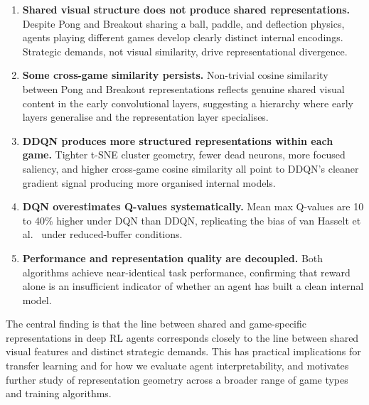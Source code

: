 \documentclass[a4paper]{article}
\begin{document}
\begin{enumerate}
    \item \textbf{Shared visual structure does not produce shared representations.} Despite Pong and Breakout sharing a ball, paddle, and deflection physics, agents playing different games develop clearly distinct internal encodings. Strategic demands, not visual similarity, drive representational divergence.
    \item \textbf{Some cross-game similarity persists.} Non-trivial cosine similarity between Pong and Breakout representations reflects genuine shared visual content in the early convolutional layers, suggesting a hierarchy where early layers generalise and the representation layer specialises.
    \item \textbf{DDQN produces more structured representations within each game.} Tighter t-SNE cluster geometry, fewer dead neurons, more focused saliency, and higher cross-game cosine similarity all point to DDQN's cleaner gradient signal producing more organised internal models.
    \item \textbf{DQN overestimates Q-values systematically.} Mean max Q-values are 10 to 40\% higher under DQN than DDQN, replicating the bias of van Hasselt et al.\ \cite{van2016deep} under reduced-buffer conditions.
    \item \textbf{Performance and representation quality are decoupled.} Both algorithms achieve near-identical task performance, confirming that reward alone is an insufficient indicator of whether an agent has built a clean internal model.
\end{enumerate}

The central finding is that the line between shared and game-specific representations in deep RL agents corresponds closely to the line between shared visual features and distinct strategic demands. This has practical implications for transfer learning and for how we evaluate agent interpretability, and motivates further study of representation geometry across a broader range of game types and training algorithms.
\end{document}
